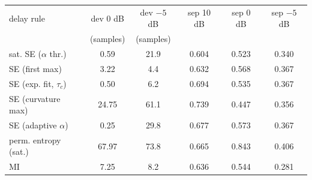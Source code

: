 \begin{tabular}{lccccc}
\toprule
delay rule & dev 0 dB & dev $-5$ dB & sep 10 dB & sep 0 dB & sep $-5$ dB \\
 & (samples) & (samples) & & & \\
\midrule
sat. SE ($\alpha$ thr.) & 0.59 & 21.9 & 0.604 & 0.523 & 0.340 \\
SE (first max) & 3.22 & 4.4 & 0.632 & 0.568 & 0.367 \\
SE (exp. fit, $\tau_c$) & 0.50 & 6.2 & 0.694 & 0.535 & 0.367 \\
SE (curvature max) & 24.75 & 61.1 & 0.739 & 0.447 & 0.356 \\
SE (adaptive $\alpha$) & 0.25 & 29.8 & 0.677 & 0.573 & 0.367 \\
perm. entropy (sat.) & 67.97 & 73.8 & 0.665 & 0.843 & 0.406 \\
MI & 7.25 & 8.2 & 0.636 & 0.544 & 0.281 \\
\bottomrule
\end{tabular}
